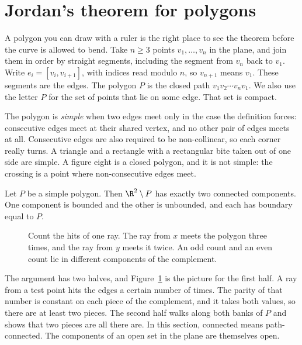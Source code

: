 \section{Jordan's theorem for polygons}\label{sec:jordanpoly}

A polygon you can draw with a ruler is the right place to see the theorem before the curve is allowed to bend. Take $n\ge3$ points $v_1,\dots,v_n$ in the plane, and join them in order by straight segments, including the segment from $v_n$ back to $v_1$. Write $e_i=[v_i,v_{i+1}]$, with indices read modulo $n$, so $v_{n+1}$ means $v_1$. These segments are the edges. The polygon $P$ is the closed path $v_1v_2\cdots v_nv_1$. We also use the letter $P$ for the set of points that lie on some edge. That set is compact.

The polygon is \emph{simple} when two edges meet only in the case the definition forces: consecutive edges meet at their shared vertex, and no other pair of edges meets at all. Consecutive edges are also required to be non-collinear, so each corner really turns. A triangle and a rectangle with a rectangular bite taken out of one side are simple. A figure eight is a closed polygon, and it is not simple: the crossing is a point where non-consecutive edges meet.

\begin{theorem}\label{thm:jordanpoly}
Let $P$ be a simple polygon. Then $\R^2\setminus P$ has exactly two connected components. One component is bounded and the other is unbounded, and each has boundary equal to $P$.
\end{theorem}

\begin{figure}[ht]\centering{}
\caption{Count the hits of one ray. The ray from $x$ meets the polygon three times, and the ray from $y$ meets it twice. An odd count and an even count lie in different components of the complement.}\label{fig:polygon}
\end{figure}

The argument has two halves, and Figure~\ref{fig:polygon} is the picture for the first half. A ray from a test point hits the edges a certain number of times. The parity of that number is constant on each piece of the complement, and it takes both values, so there are at least two pieces. The second half walks along both banks of $P$ and shows that two pieces are all there are. In this section, connected means path-connected. The components of an open set in the plane are themselves open.

